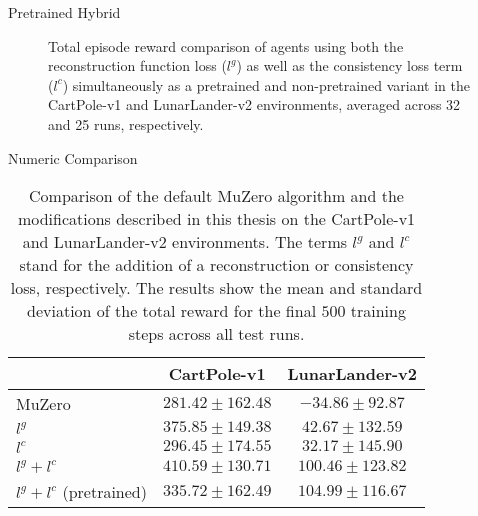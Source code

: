 \begin{frame}[fragile]{Pretrained Hybrid}
\begin{figure}
        \caption{Total episode reward comparison of agents using both the reconstruction function loss ($l^g$) as well as the consistency loss term ($l^c$) simultaneously as a pretrained and non-pretrained variant in the CartPole-v1 and LunarLander-v2 environments, averaged across 32 and 25 runs, respectively.}
        \label{fig:pretrained_results}
    \end{figure}
\end{frame}

\begin{frame}{Numeric Comparison}
    \begin{table}
        \centering
        \begin{tabular}{|l||c|c|}
            \hline
            & CartPole-v1 & LunarLander-v2 \\
            \hline \hline
            MuZero & $281.42 \pm 162.48$ & $-34.86 \pm 92.87$ \\
            \hline
            $l^g$ & $375.85 \pm 149.38$ & $42.67 \pm 132.59$\\
            \hline
            $l^c$ & $296.45 \pm 174.55$ & $32.17 \pm 145.90$ \\
            \hline
            $l^g + l^c$ & $\mathbf{410.59 \pm 130.71}$ & $100.46 \pm 123.82$ \\
            \hline
            $l^g + l^c$ (pretrained) & $335.72 \pm 162.49$ & $\mathbf{104.99 \pm 116.67}$ \\
            \hline
        \end{tabular}
        \caption{Comparison of the default MuZero algorithm and the modifications described in this thesis on the CartPole-v1 and LunarLander-v2 environments. The terms $l^g$ and $l^c$ stand for the addition of a reconstruction or consistency loss, respectively. The results show the mean and standard deviation of the total reward for the final $500$ training steps across all test runs.}
        \label{tab:results_table}
    \end{table}
\end{frame}
